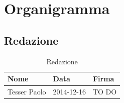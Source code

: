 %

\appendix

\section{Organigramma} %
\label{sec:organigramma}
	\subsection{Redazione} %
	\label{sub:redazione}
		\begin{table}[!h]
			\begin{center}
				\begin{tabularx}{0.8\textwidth}{|X|X|X|}
					\hline
					\textbf{Nome} & \textbf{Data} & \textbf{Firma} \\
					\hline
					\rule[-4mm]{0mm}{1cm}
					Tesser Paolo &
					2014-12-16 &
					TO DO \\
					\hline
				\end{tabularx}
			\end{center}
		\caption{Redazione}
		\end{table}
	
